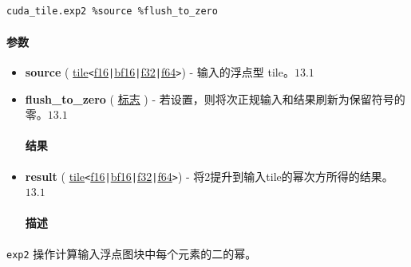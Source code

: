 \documentclass{article}
\begin{document}
\begin{lstlisting}

cuda_tile.exp2 %source %flush_to_zero

\end{lstlisting}



\paragraph{参数}


\begin{itemize}
\item \textbf{source} ( \href{https://docs.nvidia.com/cuda/tile-ir/latest/sections/types.html#type-tile}{tile}\texttt{<}\href{https://docs.nvidia.com/cuda/tile-ir/latest/sections/types.html#subsection-element-types}{f16}\texttt{|}\href{https://docs.nvidia.com/cuda/tile-ir/latest/sections/types.html#subsection-element-types}{bf16}\texttt{|}\href{https://docs.nvidia.com/cuda/tile-ir/latest/sections/types.html#subsection-element-types}{f32}\texttt{|}\href{https://docs.nvidia.com/cuda/tile-ir/latest/sections/types.html#subsection-element-types}{f64}\texttt{>}) - 输入的浮点型 tile。$\boxed{13.1}$
\item \textbf{flush\_to\_zero} ( \href{https://docs.nvidia.com/cuda/tile-ir/latest/sections/operations.html#type-flag}{标志} ) - 若设置，则将次正规输入和结果刷新为保留符号的零。$\boxed{13.1}$




\paragraph{结果}


\item \textbf{result} ( \href{https://docs.nvidia.com/cuda/tile-ir/latest/sections/types.html#type-tile}{tile}\texttt{<}\href{https://docs.nvidia.com/cuda/tile-ir/latest/sections/types.html#subsection-element-types}{f16}\texttt{|}\href{https://docs.nvidia.com/cuda/tile-ir/latest/sections/types.html#subsection-element-types}{bf16}\texttt{|}\href{https://docs.nvidia.com/cuda/tile-ir/latest/sections/types.html#subsection-element-types}{f32}\texttt{|}\href{https://docs.nvidia.com/cuda/tile-ir/latest/sections/types.html#subsection-element-types}{f64}\texttt{>}) - 将2提升到输入tile的幂次方所得的结果。$\boxed{13.1}$




\paragraph{描述}


\end{itemize}
\texttt{exp2} 操作计算输入浮点图块中每个元素的二的幂。
\end{document}
